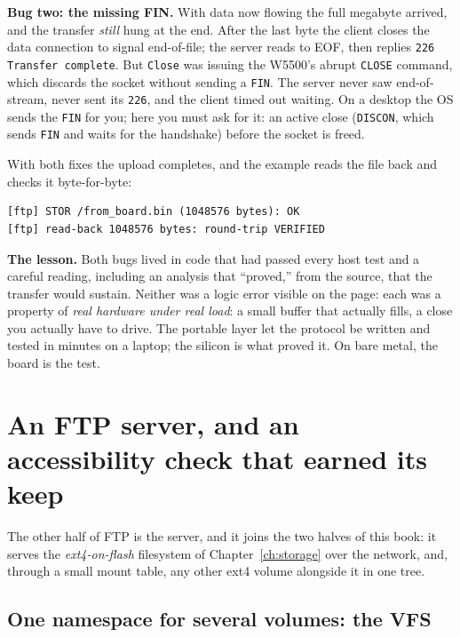 \textbf{Bug two: the missing FIN.} With data now flowing the full megabyte
arrived, and the transfer \emph{still} hung at the end. After the last byte the
client closes the data connection to signal end-of-file; the server reads to EOF,
then replies \texttt{226 Transfer complete}. But \texttt{Close} was issuing the
W5500's abrupt \texttt{CLOSE} command, which discards the socket without sending a
\texttt{FIN}. The server never saw end-of-stream, never sent its \texttt{226}, and
the client timed out waiting. On a desktop the OS sends the \texttt{FIN} for you;
here you must ask for it: an active close (\texttt{DISCON}, which sends
\texttt{FIN} and waits for the handshake) before the socket is freed.

With both fixes the upload completes, and the example reads the file back and
checks it byte-for-byte:

\begin{lstlisting}[style=sh]
[ftp] STOR /from_board.bin (1048576 bytes): OK
[ftp] read-back 1048576 bytes: round-trip VERIFIED
\end{lstlisting}

\textbf{The lesson.} Both bugs lived in code that had passed every host test and a
careful reading, including an analysis that ``proved,'' from the source, that
the transfer would sustain. Neither was a logic error visible on the page: each was
a property of \emph{real hardware under real load}: a small buffer that actually
fills, a close you actually have to drive. The portable layer let the protocol be
written and tested in minutes on a laptop; the silicon is what proved it. On bare
metal, the board is the test.

\section{An FTP server, and an accessibility check that earned its keep}
\label{ch:net:ftpd}

The other half of FTP is the server, and it joins the two halves of this book: it
serves the \emph{ext4-on-flash} filesystem of Chapter~\ref{ch:storage} over the
network, and, through a small mount table, any other ext4 volume alongside it in
one tree.

\subsection{One namespace for several volumes: the VFS}
\label{ch:net:vfs}

